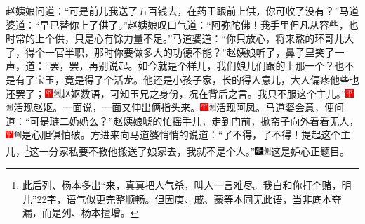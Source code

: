 赵姨娘问道：“可是前儿我送了五百钱去，在药王跟前上供，你可收了没有？”马道婆道：“早已替你上了供了。”赵姨娘叹口气道：“阿弥陀佛！我手里但凡从容些，也时常的上个供，只是心有馀力量不足。”马道婆道：“你只放心，将来熬的环哥儿大了，得个一官半职，那时你要做多大的功德不能？”赵姨娘听了，鼻子里笑了一声，道：“罢，罢，再别说起。如今就是个样儿，我们娘儿们跟的上那一个？也不是有了宝玉，竟是得了个活龙。他还是小孩子家，长的得人意儿，大人偏疼他些也还罢了；{\includegraphics[width=3mm]{../Images/00002}\includegraphics[width=3mm]{../Images/00011}\footnotesize \kaishu 赵妪数语，可知玉兄之身份，况在背后之言。}我只不服这个主儿。”{\includegraphics[width=3mm]{../Images/00002}\includegraphics[width=3mm]{../Images/00011}\footnotesize \kaishu 活现赵妪。}一面说，一面又伸出俩指头来。{\includegraphics[width=3mm]{../Images/00002}\includegraphics[width=3mm]{../Images/00011}\footnotesize \kaishu 活现阿凤。}马道婆会意，便问道：“可是琏二奶奶么？”赵姨娘唬的忙摇手儿，走到门前，掀帘子向外看看无人，{\includegraphics[width=3mm]{../Images/00002}\includegraphics[width=3mm]{../Images/00011}\footnotesize \kaishu 是心胆俱怕破。}方进来向马道婆悄悄的说道：“了不得，了不得！提起这个主儿，\footnote{此后列、杨本多出“来，真真把人气杀，叫人一言难尽。我白和你打个赌，明儿”22字，语气似更完整顺畅。但因庚、戚、蒙等本同无此语，当非底本夺漏，而是列、杨本擅增。}这一分家私要不教他搬送了娘家去，我就不是个人。”{\includegraphics[width=3mm]{../Images/00004}\includegraphics[width=3mm]{../Images/00011}\footnotesize \kaishu 这是妒心正题目。}

